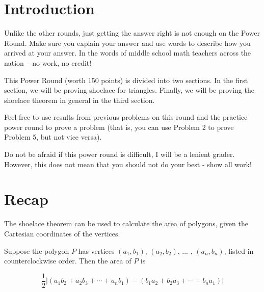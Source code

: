 \documentclass[11pt]{article}
\begin{document}
\section{Introduction}

Unlike the other rounds, just getting the answer right is not enough on the Power Round. Make sure you explain your answer and use words to describe how you arrived at your answer. In the words of middle school math teachers across the nation -- no work, no credit!

\phantom{hi} \noindent This Power Round (worth 150 points) is divided into two sections. In the first section,  we will be proving shoelace for triangles. Finally, we will be proving the shoelace theorem in general in the third section.

\phantom{hi} \noindent Feel free to use results from previous problems on this round and the practice power round to prove a problem (that is, you can use Problem 2 to prove Problem 5, but not vice versa). 

\phantom{hi} \noindent Do not be afraid if this power round is difficult, I will be a lenient grader. However, this does not mean that you should not do your best - show all work!

\section{Recap}

The shoelace theorem can be used to calculate the area of polygons, given the Cartesian coordinates of the vertices. 

\begin{theorem} Suppose the polygon $P$ has vertices $(a_1, b_1)$, $(a_2, b_2)$, ... , $(a_n, b_n)$, listed in counterclockwise order. Then the area of $P$ is

\[\dfrac{1}{2} |(a_1b_2 + a_2b_3 + \cdots + a_nb_1) - (b_1a_2 + b_2a_3 + \cdots + b_na_1)|\]
\end{theorem}
\begin{comment}
The Shoelace Theorem gets its name because if one lists the coordinates in a column, 
\begin{align*} 
(a_1 &, b_1) \\ 
(a_2 &, b_2) \\ 
& \vdots \\ 
(a_n &, b_n) \\ 
(a_1 &, b_1) \\ 
\end{align*} 
and marks the pairs of coordinates to be multiplied, the resulting image looks like laced-up shoes.
\end{comment}
\end{document}
